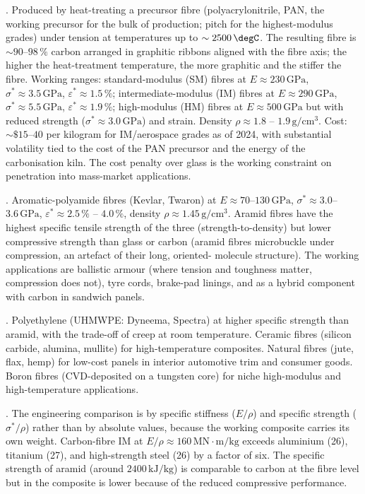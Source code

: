 . Produced by heat-treating a precursor fibre
(polyacrylonitrile, PAN, the working precursor for the bulk of
production; pitch for the highest-modulus grades) under tension at
temperatures up to $\sim 2500\,\degC$. The resulting fibre is
$\sim 90$--$98\,\%$ carbon arranged in graphitic ribbons aligned with
the fibre axis; the higher the heat-treatment temperature, the more
graphitic and the stiffer the fibre. Working ranges: standard-modulus
(SM) fibres at $E \approx 230\,\text{GPa}$, $\sigma^* \approx 3.5\,
\text{GPa}$, $\varepsilon^* \approx 1.5\,\%$; intermediate-modulus
(IM) fibres at $E \approx 290\,\text{GPa}$, $\sigma^* \approx 5.5\,
\text{GPa}$, $\varepsilon^* \approx 1.9\,\%$; high-modulus (HM) fibres
at $E \approx 500\,\text{GPa}$ but with reduced strength
($\sigma^* \approx 3.0\,\text{GPa}$) and strain. Density $\rho \approx
1.8$ -- $1.9\,\text{g}/\text{cm}^3$. Cost: $\sim \$15$--$40$ per
kilogram for IM/aerospace grades as of 2024, with substantial
volatility tied to the cost of the PAN precursor and the energy of
the carbonisation kiln. The cost penalty over glass is the working
constraint on penetration into mass-market applications.

. Aromatic-polyamide fibres (Kevlar, Twaron) at
$E \approx 70$--$130\,\text{GPa}$, $\sigma^* \approx 3.0$--$3.6\,
\text{GPa}$, $\varepsilon^* \approx 2.5\,\%$ -- $4.0\,\%$, density
$\rho \approx 1.45\,\text{g}/\text{cm}^3$. Aramid fibres have the
highest specific tensile strength of the three (strength-to-density)
but lower compressive strength than glass or carbon (aramid fibres
microbuckle under compression, an artefact of their long, oriented-
molecule structure). The working applications are ballistic armour
(where tension and toughness matter, compression does not), tyre
cords, brake-pad linings, and as a hybrid component with carbon in
sandwich panels.

. Polyethylene (UHMWPE: Dyneema,
Spectra) at higher specific strength than aramid, with the trade-off
of creep at room temperature. Ceramic fibres (silicon carbide, alumina,
mullite) for high-temperature composites. Natural fibres (jute, flax,
hemp) for low-cost panels in interior automotive trim and consumer
goods. Boron fibres (CVD-deposited on a tungsten core) for niche
high-modulus and high-temperature applications.

. The engineering comparison
is by specific stiffness ($E/\rho$) and specific strength
($\sigma^*/\rho$) rather than by absolute values, because the working
composite carries its own weight. Carbon-fibre IM at $E/\rho \approx
160\,\text{MN}\cdot\text{m}/\text{kg}$ exceeds aluminium (26),
titanium (27), and high-strength steel (26) by a factor of six. The
specific strength of aramid (around $2400\,\text{kJ}/\text{kg}$) is
comparable to carbon at the fibre level but in the composite is lower
because of the reduced compressive performance.

